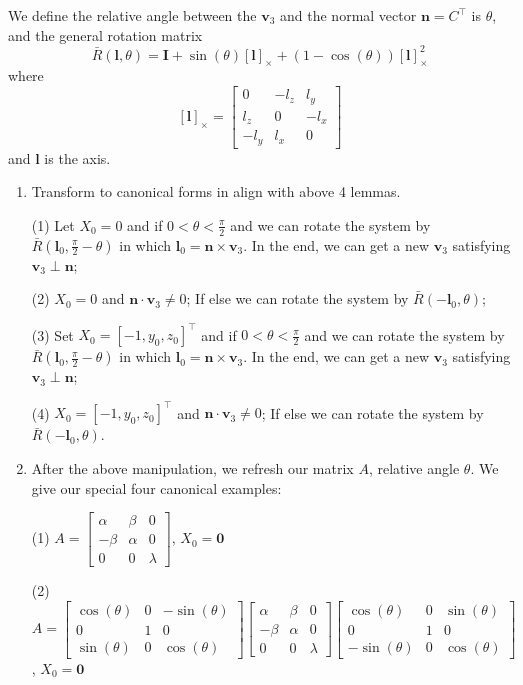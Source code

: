 \documentclass[a4paper,10pt]{article}
\begin{document}
	We define the relative angle between the $\mathbf{v}_3 $ and the normal vector $ \mathbf{n} = C^{\top}$ is $\theta$, and the general rotation matrix 
	\begin{equation}
	\bar{R}(\mathbf{l},\theta) = \mathbf{I}+ \sin(\theta) [\mathbf{l}]_{\times} + (1-\cos(\theta))[\mathbf{l}]_{\times}^2
	\label{eq:rotation matrix}
	\end{equation}
	where 
	$$
	[\mathbf{l}]_{\times} = \begin{bmatrix}
	0 		 & -{l}_z  & {l}_y\\
	{l}_z    & 		0  & -{l}_x\\
	-{l}_y   &  {l}_x  & 0
	\end{bmatrix}
	$$
	and $\mathbf{l}$ is the axis.
	\begin{enumerate}
		\item  Transform to canonical forms in align with above 4 lemmas.
		
		(1) Let $X_0=0$ and if $0< \theta < \frac{\pi}{2}$ 
		and we can rotate the system by  $\bar{R}(\mathbf{l}_0,\frac{\pi}{2}-\theta)$ in which $\mathbf{l}_0 =  \mathbf{n} \times \mathbf{v}_3 $. In the end, we can get a new $\mathbf{v}_3$ satisfying $\mathbf{v}_3 \perp \mathbf{n}$; 
		
		(2) $X_0=0$ and $\mathbf{n} \cdot \mathbf{v}_3\neq 0$; If else we can rotate the system by $\bar{R}(-\mathbf{l}_0,\theta)$;
		
		(3) Set $X_0=[-1,y_0,z_0]^{\top}$ and if $0< \theta < \frac{\pi}{2}$ 
		and we can rotate the system by  $\bar{R}(\mathbf{l}_0,\frac{\pi}{2}-\theta)$ in which $\mathbf{l}_0 =  \mathbf{n} \times \mathbf{v}_3 $. In the end, we can get a new $\mathbf{v}_3$ satisfying $\mathbf{v}_3 \perp \mathbf{n}$;
		
		(4) $X_0=[-1,y_0,z_0]^{\top}$ and $\mathbf{n} \cdot \mathbf{v}_3 \neq 0$; If else we can rotate the system by $\bar{R}(-\mathbf{l}_0,\theta)$.
		\item After the above manipulation, we refresh our matrix $A$, relative angle $\theta$.
		We give our special four canonical examples:
		
		(1) $A = \begin{bmatrix}
		\alpha & \beta & 0\\
		- \beta & \alpha & 0\\
		0 & 0 & \lambda
		\end{bmatrix}$, $X_0=\mathbf{0}$
		
		(2) $A =\begin{bmatrix}
		\cos(\theta) & 0 & -\sin(\theta)\\
		0& 1& 0\\
		\sin(\theta) & 0 & \cos(\theta)
		\end{bmatrix} 
		\begin{bmatrix}
		\alpha & \beta & 0\\
		- \beta & \alpha & 0\\
		0 & 0 & \lambda
		\end{bmatrix}
		\begin{bmatrix}
		\cos(\theta) & 0 & \sin(\theta)\\
		0& 1& 0\\
		-\sin(\theta) & 0 & \cos(\theta)
		\end{bmatrix} $, $X_0=\mathbf{0}$
		

\end{enumerate}
\end{document}
